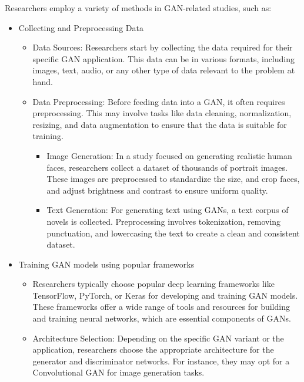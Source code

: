 \noindent
Researchers employ a variety of methods in GAN-related studies, such as:
\begin{itemize}
    \item Collecting and Preprocessing Data
    \begin{itemize}
        \item Data Sources: Researchers start by collecting the data required for their specific GAN application. This data can be in various formats, including images, text, audio, or any other type of data relevant to the problem at hand.

        \item Data Preprocessing: Before feeding data into a GAN, it often requires preprocessing. This may involve tasks like data cleaning, normalization, resizing, and data augmentation to ensure that the data is suitable for training.
        
        \begin{itemize}
            \item Image Generation: In a study focused on generating realistic human faces, researchers collect a dataset of thousands of portrait images. These images are preprocessed to standardize the size, and crop faces, and adjust brightness and contrast to ensure uniform quality.
            \item Text Generation: For generating text using GANs, a text corpus of novels is collected. Preprocessing involves tokenization, removing punctuation, and lowercasing the text to create a clean and consistent dataset.
        \end{itemize}
    \end{itemize}
    
    \item Training GAN models using popular frameworks
    \begin{itemize}
        \item Researchers typically choose popular deep learning frameworks like TensorFlow, PyTorch, or Keras for developing and training GAN models. These frameworks offer a wide range of tools and resources for building and training neural networks, which are essential components of GANs.
        \item Architecture Selection: Depending on the specific GAN variant or the application, researchers choose the appropriate architecture for the generator and discriminator networks. For instance, they may opt for a Convolutional GAN for image generation tasks.
    \end{itemize}
    

\end{itemize}
